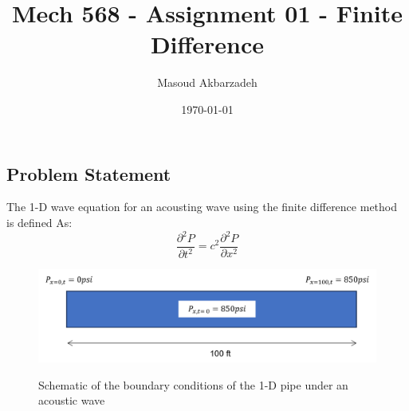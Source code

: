 \documentclass[12pt]{article}
\begin{document}
\title{Mech 568 - Assignment 01 - Finite Difference}
\author{Masoud Akbarzadeh}
\date{\today}


\maketitle


\section{}\label{sec:problem-1}

\subsection{Problem Statement}\label{subsec:Problem Statement}
The 1-D wave equation for an acousting wave using the finite difference method is defined As:
\begin{equation}
    \frac{\partial^2 P}{\partial t^2} = c^2 \frac{\partial^2 P}{\partial x^2}
\end{equation}

\begin{figure}
\begin{center}
\includegraphics[width=\textwidth]{problem-statement.png}
\caption{Schematic of the boundary conditions of the 1-D pipe under an acoustic wave}{\label{fig: problem-2-c}}
\end{center}
\end{figure}
\end{document}
